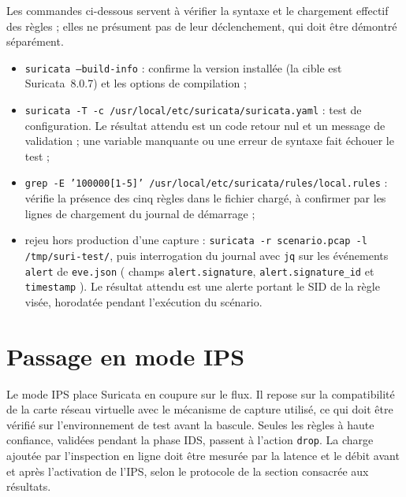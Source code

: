 Les commandes ci-dessous servent à vérifier la syntaxe et le chargement effectif des règles ; elles ne présument pas de leur déclenchement, qui doit être démontré séparément.
\begin{itemize}
\item \texttt{suricata --build-info} : confirme la version installée (la cible est Suricata~8.0.7) et les options de compilation ;
\item \texttt{suricata -T -c /usr/local/etc/suricata/suricata.yaml} : test de configuration. Le résultat attendu est un code retour nul et un message de validation ; une variable manquante ou une erreur de syntaxe fait échouer le test ;
\item \texttt{grep -E '100000[1-5]' /usr/local/etc/suricata/rules/local.rules} : vérifie la présence des cinq règles dans le fichier chargé, à confirmer par les lignes de chargement du journal de démarrage ;
\item rejeu hors production d'une capture : \texttt{suricata -r scenario.pcap -l /tmp/suri-test/}, puis interrogation du journal avec \texttt{jq} sur les événements \texttt{alert} de \texttt{eve.json} ( champs \texttt{alert.signature}, \texttt{alert.signature\_id} et \texttt{timestamp} ). Le résultat attendu est une alerte portant le SID de la règle visée, horodatée pendant l'exécution du scénario.
\end{itemize}


\section{Passage en mode IPS}

Le mode IPS place Suricata en coupure sur le flux. Il repose sur la compatibilité de la carte réseau virtuelle avec le mécanisme de capture utilisé, ce qui doit être vérifié sur l'environnement de test avant la bascule. Seules les règles à haute confiance, validées pendant la phase IDS, passent à l'action \texttt{drop}. La charge ajoutée par l'inspection en ligne doit être mesurée par la latence et le débit avant et après l'activation de l'IPS, selon le protocole de la section consacrée aux résultats.

